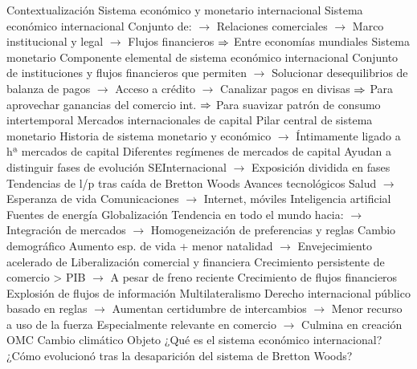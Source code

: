 \documentclass{nuevotema}
\begin{document}
\esquemalargo















\begin{esquemal}
	\1[] 
		\2 Contextualización
			\3 Sistema económico y monetario internacional
				\4 Sistema económico internacional
				\4[] Conjunto de:
				\4[] $\to$ Relaciones comerciales
				\4[] $\to$ Marco institucional y legal
				\4[] $\to$ Flujos financieros
				\4[] $\Rightarrow$ Entre economías mundiales
				\4 Sistema monetario
				\4[] Componente elemental de sistema económico internacional
				\4[] Conjunto de instituciones y flujos financieros que permiten
				\4[] $\to$ Solucionar desequilibrios de balanza de pagos
				\4[] $\to$ Acceso a crédito
				\4[] $\to$ Canalizar pagos en divisas
				\4[] $\Rightarrow$ Para aprovechar ganancias del comercio int.
				\4[] $\Rightarrow$ Para suavizar patrón de consumo intertemporal
			\3 Mercados internacionales de capital
				\4 Pilar central de sistema monetario
				\4 Historia de sistema monetario y económico
				\4[] $\to$ Íntimamente ligado a hª mercados de capital
				\4 Diferentes regímenes de mercados de capital
				\4[] Ayudan a distinguir fases de evolución SEInternacional
				\4[] $\to$ Exposición dividida en fases
			\3 Tendencias de l/p tras caída de Bretton Woods
				\4 Avances tecnológicos
				\4[] Salud
				\4[] $\to$ Esperanza de vida
				\4[] Comunicaciones
				\4[] $\to$ Internet, móviles
				\4[] Inteligencia artificial
				\4[] Fuentes de energía
				\4 Globalización
				\4[] Tendencia en todo el mundo hacia:
				\4[] $\to$ Integración de mercados
				\4[] $\to$ Homogeneización de preferencias y reglas
				\4 Cambio demográfico
				\4[] Aumento esp. de vida + menor natalidad
				\4[] $\to$ Envejecimiento acelerado de
				\4 Liberalización comercial y financiera
				\4[] Crecimiento persistente de comercio > PIB
				\4[] $\to$ A pesar de freno reciente
				\4[] Crecimiento de flujos financieros
				\4[] Explosión de flujos de información
				\4 Multilateralismo
				\4[] Derecho internacional público basado en reglas
				\4[] $\to$ Aumentan certidumbre de intercambios
				\4[] $\to$ Menor recurso a uso de la fuerza
				\4[] Especialmente relevante en comercio
				\4[] $\to$ Culmina en creación OMC
				\4 Cambio climático
		\2 Objeto
			\3 ¿Qué es el sistema económico internacional?
			\3 ¿Cómo evolucionó tras la desaparición del sistema de Bretton Woods?

\end{esquemal}
\end{document}

